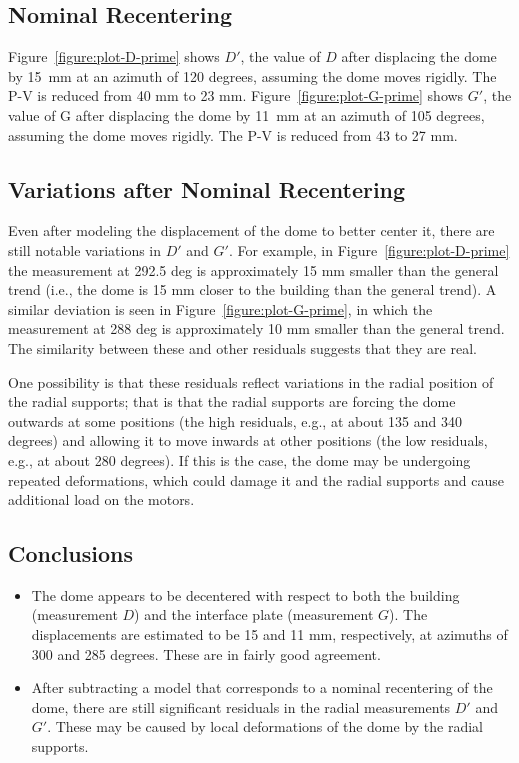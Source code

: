 \documentclass{article}
\begin{document}
\subsection{Nominal Recentering}

Figure~\ref{figure:plot-D-prime} shows $D'$, the value of $D$ after displacing the dome by 15~mm at an azimuth of 120 degrees, assuming the dome moves rigidly. The P-V is reduced from 40 mm to 23 mm. Figure~\ref{figure:plot-G-prime} shows $G'$, the value of G after displacing the dome by 11~mm at an azimuth of 105 degrees, assuming the dome moves rigidly. The P-V is reduced from 43 to 27 mm.

\subsection{Variations after Nominal Recentering}

Even after modeling the displacement of the dome to better center it, there are still notable variations in $D'$ and $G'$. For example, in Figure~\ref{figure:plot-D-prime} the measurement at 292.5 deg is approximately 15 mm smaller than the general trend (i.e., the dome is 15 mm closer to the building than the general trend). A similar deviation is seen in Figure~\ref{figure:plot-G-prime}, in which the measurement at 288 deg is approximately 10 mm smaller than the general trend. The similarity between these and other residuals suggests that they are real. 

One possibility is that these residuals reflect variations in the radial position of the radial supports; that is that the radial supports are forcing the dome outwards at some positions (the high residuals, e.g., at about 135 and 340 degrees) and allowing it to move inwards at other positions (the low residuals, e.g., at about 280 degrees). If this is the case, the dome may be undergoing repeated deformations, which could damage it and the radial supports and cause additional load on the motors.

\subsection{Conclusions}

\begin{itemize}
    \item The dome appears to be decentered with respect to both the building (measurement $D$) and the interface plate (measurement $G$). The displacements are estimated to be 15 and 11 mm, respectively, at azimuths of 300 and 285 degrees. These are in fairly good agreement.
    \item After subtracting a model that corresponds to a nominal recentering of the dome, there are still significant residuals in the radial measurements $D'$ and $G'$. These may be caused by local deformations of the dome by the radial supports.
\end{itemize}
\end{document}
